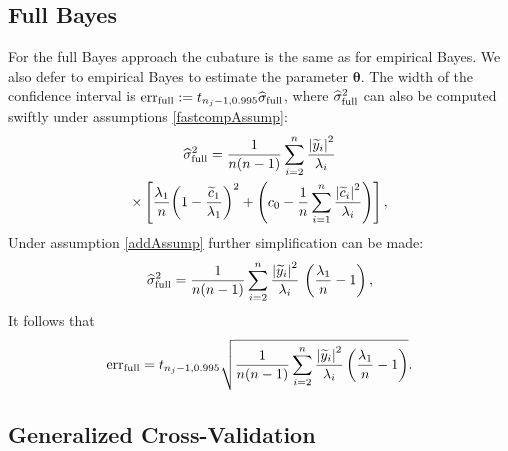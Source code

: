 \documentclass[twocolumn]{svjour3}          %
\newcommand{\bm}[1]{\boldsymbol{#1}}
\newcommand{\vtheta}{{\bm{\theta}}}
\newcommand{\hsigma}{\widehat{\sigma}}
\newcommand{\err}{\textup{err}}
\def\abs#1{\ensuremath{\left \lvert #1 \right \rvert}}
\begin{document}
\subsection{Full Bayes}
For the full Bayes approach the cubature is the same as for empirical Bayes.  We also defer to empirical Bayes to estimate the parameter $\vtheta$.  The width of the confidence interval is $\err_{\textup{full}} 
:= t_{n_j-1,0.995} \hsigma_{\textup{full}}$, where $\hsigma_{\textup{full}}^2$ can also be computed swiftly under assumptions \eqref{fastcompAssump}:
\begin{multline*} %
\widehat{\sigma}^2_{\textup{full}}
=
\frac{1}{n(n-1)} \sum_{i=2}^n \frac{\abs{\widetilde{y}_i}^2}{\lambda_i}
\\
\times
\left[\frac{\lambda_1}{n}{\left(1 - \frac{\widetilde{c}_1}{\lambda_1}\right)^2} + \left(c_0  - \frac 1n \sum_{i=1}^n \frac{\abs{\widetilde{c}_i}^2}{\lambda_i}\right) \right],
\end{multline*}
Under assumption \eqref{addAssump} further simplification can be made:
\begin{align*} %
\widehat{\sigma}^2_{\textup{full}}
=
\frac{1}{n(n-1)} \sum_{i=2}^n \frac{\abs{\widetilde{y}_i}^2}{\lambda_i} \, \left(\frac{\lambda_1}{n}  - 1  \right),
\end{align*}
It follows that
\begin{align} \label{FJH:eq:errFullSimple}
\err_{\textup{full}}
=
t_{n_j-1,0.995}
\sqrt{\frac{1}{n(n-1)} \sum_{i=2}^n \frac{\abs{\widetilde{y}_i}^2}{\lambda_i}  \left(\frac{\lambda_1}{n}  - 1  \right)}.
\end{align}


\subsection{Generalized Cross-Validation}
\end{document}
